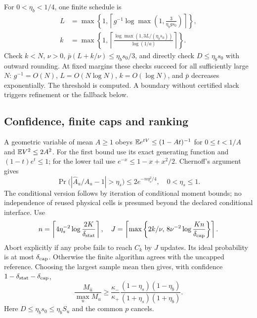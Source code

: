 For $0<\eta_b<1/4$, one finite schedule is
\begin{align}
 L&=\max\left\{1,\left\lceil g^{-1}\log\max\left(1,\frac3{\eta_bgs_0}\right)\right\rceil\right\},\\
 k&=\max\left\{1,\left\lceil\frac{\log\max(1,3L/(\eta_bs_0))}{\log(1/a)}\right\rceil\right\}.
 \label{eq:schedule}
\end{align}
Check $k<N$, $\nu>0$, $\bar p(L+k/\nu)\le\eta_b s_0/3$, and directly check $D\le\eta_b s_0$ with outward rounding. At fixed margins these checks succeed for all sufficiently large $N$: $g^{-1}=O(N)$, $L=O(N\log N)$, $k=O(\log N)$, and $\bar p$ decreases exponentially. The threshold is computed. A boundary without certified slack triggers refinement or the fallback below.

\subsection{Confidence, finite caps and ranking}
A geometric variable of mean $A\ge1$ obeys
$\mathbb E e^{tV}\le(1-At)^{-1}$ for $0\le t<1/A$ and $\mathbb E V^2\le2A^2$.
For the first bound use its exact generating function and $(1-t)e^t\le1$; for the lower tail use $e^{-x}\le1-x+x^2/2$. Chernoff's argument gives
\begin{equation}
 \Pr\big(|\widehat A_u/A_u-1|>\eta_s\big)\le2e^{-n\eta_s^2/4},
 \quad0<\eta_s\le1.
 \label{eq:concentration}
\end{equation}
The conditional version follows by iteration of conditional moment bounds; no independence of reused physical cells is presumed beyond the declared conditional interface.
Use
\begin{equation}
 n=\left\lceil4\eta_s^{-2}\log\frac{2K}{\delta_{\rm stat}}\right\rceil,
 \quad J=\left\lceil\max\left\{2k/\nu,\,8\nu^{-2}\log\frac{Kn}{\delta_{\rm cap}}\right\}\right\rceil.
 \label{eq:finitecaps}
\end{equation}
Abort explicitly if any probe fails to reach $C_k$ by $J$ updates. Its ideal probability is at most $\delta_{\rm cap}$. Otherwise the finite algorithm agrees with the uncapped reference. Choosing the largest sample mean then gives, with confidence $1-\delta_{\rm stat}-\delta_{\rm cap}$,
\begin{equation}
 \frac{M_{\widehat u}}{\max_uM_u}
 \ge\frac{\kappa_-}{\kappa_+}
 \frac{(1-\eta_s)(1-\eta_b)}{(1+\eta_s)(1+\eta_b)}.
 \label{eq:decisionfactor}
\end{equation}
Here $D\le\eta_b s_0\le\eta_b S_u$ and the common $p$ cancels.

